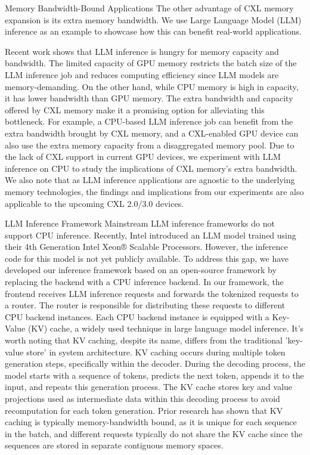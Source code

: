 Memory Bandwidth-Bound Applications
The other advantage of CXL memory expansion is its extra memory bandwidth. We use Large Language Model (LLM) inference as an example to showcase how this can benefit real-world applications.

Recent work shows that LLM inference is hungry for memory capacity and bandwidth. The limited capacity of GPU memory restricts the batch size of the LLM inference job and reduces computing efficiency since LLM models are memory-demanding. On the other hand, while CPU memory is high in capacity, it has lower bandwidth than GPU memory. The extra bandwidth and capacity offered by CXL memory make it a promising option for alleviating this bottleneck. For example, a CPU-based LLM inference job can benefit from the extra bandwidth brought by CXL memory, and a CXL-enabled GPU device can also use the extra memory capacity from a disaggregated memory pool. Due to the lack of CXL support in current GPU devices, we experiment with LLM inference on CPU to study the implications of CXL memory's extra bandwidth. We also note that as LLM inference applications are agnostic to the underlying memory technologies, the findings and implications from our experiments are also applicable to the upcoming CXL 2.0/3.0 devices.

LLM Inference Framework
Mainstream LLM inference frameworks do not support CPU inference. Recently, Intel introduced an LLM model trained using their 4th Generation Intel Xeon® Scalable Processors. However, the inference code for this model is not yet publicly available. To address this gap, we have developed our inference framework based on an open-source framework by replacing the backend with a CPU inference backend. In our framework, the frontend receives LLM inference requests and forwards the tokenized requests to a router. The router is responsible for distributing these requests to different CPU backend instances. Each CPU backend instance is equipped with a Key-Value (KV) cache, a widely used technique in large language model inference. It's worth noting that KV caching, despite its name, differs from the traditional 'key-value store' in system architecture. KV caching occurs during multiple token generation steps, specifically within the decoder. During the decoding process, the model starts with a sequence of tokens, predicts the next token, appends it to the input, and repeats this generation process. The KV cache stores key and value projections used as intermediate data within this decoding process to avoid recomputation for each token generation. Prior research has shown that KV caching is typically memory-bandwidth bound, as it is unique for each sequence in the batch, and different requests typically do not share the KV cache since the sequences are stored in separate contiguous memory spaces.

